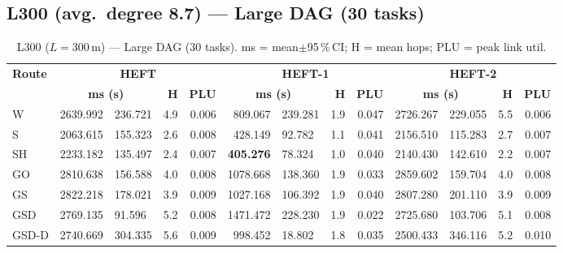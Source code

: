 \documentclass[11pt]{article}
\newcommand{\win}[1]{\textcolor{green!50!black}{\textbf{#1}}}
\newcommand{\bad}[1]{\textcolor{red!70!black}{#1}}
\begin{document}
\subsection{L300 (avg.\ degree 8.7) --- Large DAG (30 tasks)}
\begin{table}[H]\centering\small
\begin{tabular}{l r@{$\pm$}l r r r@{$\pm$}l r r r@{$\pm$}l r r}
\toprule
\textbf{Route} & \multicolumn{4}{c}{\textbf{HEFT}} & \multicolumn{4}{c}{\textbf{HEFT-1}} & \multicolumn{4}{c}{\textbf{HEFT-2}} \\
\cmidrule(lr){2-5}\cmidrule(lr){6-9}\cmidrule(lr){10-13}
& \multicolumn{2}{c}{\textbf{ms (s)}} & \textbf{H} & \textbf{PLU}& \multicolumn{2}{c}{\textbf{ms (s)}} & \textbf{H} & \textbf{PLU}& \multicolumn{2}{c}{\textbf{ms (s)}} & \textbf{H} & \textbf{PLU} \\
\midrule
  W & 2639.992 & 236.721 & 4.9 & 0.006 & 809.067 & 239.281 & 1.9 & 0.047 & 2726.267 & 229.055 & 5.5 & 0.006 \\
  S & 2063.615 & 155.323 & 2.6 & 0.008 & 428.149 & 92.782 & 1.1 & 0.041 & 2156.510 & 115.283 & 2.7 & 0.007 \\
  SH & 2233.182 & 135.497 & 2.4 & 0.007 & \win{405.276} & 78.324 & 1.0 & 0.040 & 2140.430 & 142.610 & 2.2 & 0.007 \\
  GO & 2810.638 & 156.588 & 4.0 & 0.008 & 1078.668 & 138.360 & 1.9 & 0.033 & \bad{2859.602} & 159.704 & 4.0 & 0.008 \\
  GS & \bad{2822.218} & 178.021 & 3.9 & 0.009 & 1027.168 & 106.392 & 1.9 & 0.040 & 2807.280 & 201.110 & 3.9 & 0.009 \\
  GSD & 2769.135 & 91.596 & 5.2 & 0.008 & \bad{1471.472} & 228.230 & 1.9 & 0.022 & 2725.680 & 103.706 & 5.1 & 0.008 \\
  GSD-D & 2740.669 & 304.335 & 5.6 & 0.009 & 998.452 & 18.802 & 1.8 & 0.035 & 2500.433 & 346.116 & 5.2 & 0.010 \\
\bottomrule\end{tabular}
\caption{L300 ($L=300$\,m) --- Large DAG (30 tasks). ms = mean$\pm$95\,\%\,CI; H = mean hops; PLU = peak link util.}
\end{table}
\end{document}
